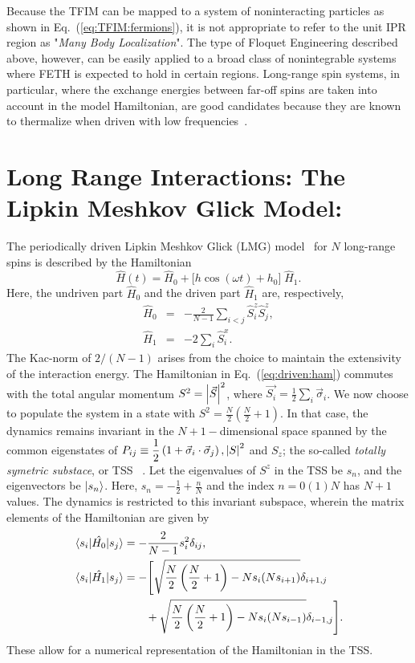 \documentclass[%
reprint,
superscriptaddress,
amsmath,amssymb,
aps,
prb,
showkeys,
]{revtex4-2}
\begin{document}
Because the TFIM can be mapped to a system of noninteracting particles as shown in Eq.~(\ref{eq:TFIM:fermions}), it is not appropriate to refer to the unit IPR region as "\emph{Many Body Localization}". The type of Floquet Engineering described above, however, can be easily applied to a broad class of nonintegrable systems where FETH is expected to hold in certain regions. Long-range spin systems, in particular, where the exchange energies between far-off spins are taken into account in the model Hamiltonian, are good candidates because they are known to thermalize when driven with low frequencies~\cite{russomanno_thermalization_2015}.
\section{\label{sec:level3}Long Range Interactions: The Lipkin Meshkov Glick Model: }	
The periodically driven {Lipkin Meshkov Glick (LMG)} model~\cite{lmg1965_1,defenu2018} for $N$ long-range spins is described by the Hamiltonian
\begin{equation}
	\hat{H}(t) = \hat{H}_0 + \big[h \cos{(\omega t)} + h_0\big]\; \hat{H}_1.
	\label{eq:driven:ham}
\end{equation}
Here, the undriven part $\hat{H}_0$ and the driven part $\hat{H}_1$ are, respectively, 
	\begin{eqnarray}
		\hat{H}_0 &=& -\frac{2}{N-1} \sum_{i<j}\hat{S}^z_i \hat{S}^z_j,\nonumber \\
		\hat{H}_1 &=& -2 \sum_i \hat{S}^x_i.
		\label{eq:h0h1}
	\end{eqnarray}
	The Kac-norm of $2/(N-1)$ arises from the choice to maintain the extensivity of the interaction energy. The Hamiltonian in Eq.~(\ref{eq:driven:ham}) commutes
with the total angular momentum $S^2 = \abs{\vec{S}}^2$, where $\vec{S_i}=\frac12 \sum_i \vec{\sigma}_i$. We now choose to populate the system in a state with $S^2=\displaystyle\frac{N}{2}\left(\frac{N}{2}+1\right)$. In that case, the dynamics remains invariant in the  $N+1-$dimensional space spanned by the common eigenstates of $P_{ij} \equiv \displaystyle\frac{1}{2}\left(1+ \vec{\sigma}_i\cdot\vec{\sigma}_j\right), \abs{S}^2$ and $S_z$; the so-called \textit{ totally symetric substace}, or TSS ~\cite{mori_prethermalization_2019}. Let the eigenvalues of $S^z$ in the TSS be $s_n$, and the eigenvectors be $\ket{s_n}$. Here, $s_n=-\frac{1}{2}+\frac{n}{N}$ and the index
$n= 0 (1) N$ has $N+1$ values. The dynamics is restricted to this invariant subspace, wherein the matrix elements of the Hamiltonian are given by
\begin{align}
	\mel{s_i}{\hat{H_0}}{s_j} &= -\frac{2}{N-1} s^2_i \delta_{ij},\nonumber\\
	\mel{s_i}{\hat{H_1}}{s_j} &= -\Bigg[\sqrt{\frac{N}{2}\left(\frac{N}{2}+1\right) - Ns_i(Ns_{i + 1})}\delta_{i+1, j} \nonumber\\ 
	&\hskip 0.7cm +\sqrt{\frac{N}{2}\left(\frac{N}{2}+1\right) - Ns_i(Ns_{i- 1})}\delta_{i-1,j}\Bigg].
	\label{eq:lmg:tssham}
\end{align}
These allow for a numerical representation of the Hamiltonian in the TSS.
\end{document}
